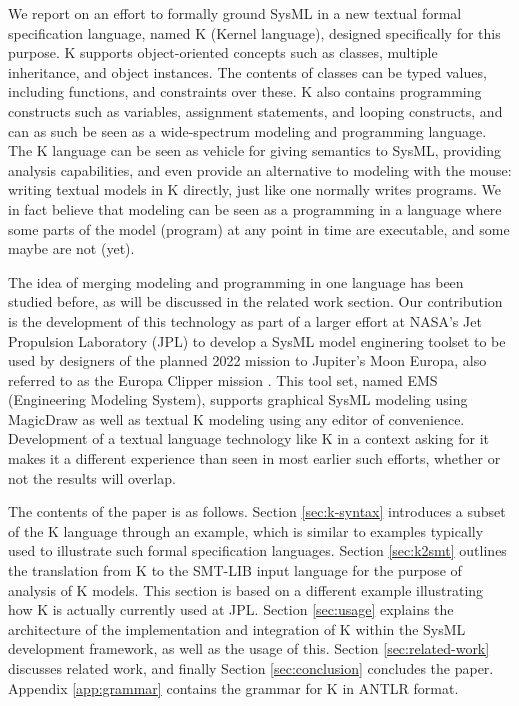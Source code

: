 We report on an effort to formally ground SysML in a new textual
formal specification language, named K (Kernel language), designed
specifically for this purpose.  K supports object-oriented concepts
such as classes, multiple inheritance, and object instances. The
contents of classes can be typed values, including functions, and
constraints over these. K also contains programming constructs such as
variables, assignment statements, and looping constructs, and can as
such be seen as a wide-spectrum modeling and programming language.
The K language can be seen as vehicle for giving semantics to SysML,
providing analysis capabilities, and even provide an alternative to
modeling with the mouse: writing textual models in K directly, just
like one normally writes programs.  We in fact believe that modeling
can be seen as a programming in a language where some parts of the
model (program) at any point in time are executable, and some maybe 
are not (yet).

The idea of merging modeling and programming in one language has been
studied before, as will be discussed in the related work section. Our
contribution is the development of this technology as part of a larger
effort at NASA’s Jet Propulsion Laboratory (JPL) to develop a SysML
model enginering toolset to be used by designers of the planned 2022
mission to Jupiter's Moon Europa, also referred to as the Europa
Clipper mission \cite{europa-clipper}. This tool set, named EMS (Engineering
Modeling System), supports graphical SysML modeling using MagicDraw
\cite{magicdraw} as well as textual K modeling using any editor of
convenience. Development of a textual language technology like K in a
context asking for it makes it a different experience than seen
in most earlier such efforts, whether or not the results will overlap.

The contents of the paper is as follows.  
Section \ref{sec:k-syntax} introduces a subset of the K language
through an example, which is similar to examples typically used
to illustrate such formal specification languages. Section \ref{sec:k2smt} outlines the translation
from K to the SMT-LIB input language for the purpose of analysis of
K models. This section is based on a different example illustrating how K
is actually currently used at JPL. Section \ref{sec:usage} explains the architecture of the
implementation and integration of K within the SysML development
framework, as well as the usage of this. Section \ref{sec:related-work}
discusses related work, and finally Section \ref{sec:conclusion}
concludes the paper. Appendix \ref{app:grammar} contains the grammar for K in ANTLR
\cite{antlr} format.
